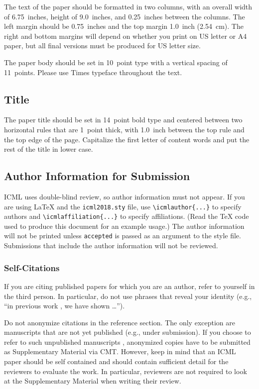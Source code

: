 \documentclass{article}
\begin{document}
The text of the paper should be formatted in two columns, with an
overall width of 6.75~inches, height of 9.0~inches, and 0.25~inches
between the columns. The left margin should be 0.75~inches and the top
margin 1.0~inch (2.54~cm). The right and bottom margins will depend on
whether you print on US letter or A4 paper, but all final versions
must be produced for US letter size.

The paper body should be set in 10~point type with a vertical spacing
of 11~points. Please use Times typeface throughout the text.

\subsection{Title}

The paper title should be set in 14~point bold type and centered
between two horizontal rules that are 1~point thick, with 1.0~inch
between the top rule and the top edge of the page. Capitalize the
first letter of content words and put the rest of the title in lower
case.

\subsection{Author Information for Submission}
\label{author info}

ICML uses double-blind review, so author information must not appear. If
you are using \LaTeX\/ and the \texttt{icml2018.sty} file, use
\verb+\icmlauthor{...}+ to specify authors and \verb+\icmlaffiliation{...}+ to specify affiliations. (Read the TeX code used to produce this document for an example usage.) The author information
will not be printed unless \texttt{accepted} is passed as an argument to the
style file.
Submissions that include the author information will not
be reviewed.

\subsubsection{Self-Citations}

If you are citing published papers for which you are an author, refer
to yourself in the third person. In particular, do not use phrases
that reveal your identity (e.g., ``in previous work \cite{langley00}, we
have shown \ldots'').

Do not anonymize citations in the reference section. The only exception are manuscripts that are
not yet published (e.g., under submission). If you choose to refer to
such unpublished manuscripts \cite{anonymous}, anonymized copies have
to be submitted
as Supplementary Material via CMT\@. However, keep in mind that an ICML
paper should be self contained and should contain sufficient detail
for the reviewers to evaluate the work. In particular, reviewers are
not required to look at the Supplementary Material when writing their
review.
\end{document}
